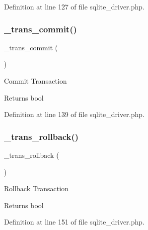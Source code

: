 Definition at line 127 of file sqlite\+\_\+driver.\+php.

\mbox{\label{class_c_i___d_b__sqlite__driver_a6fe7f373e0b11cfae23a5f41c0b35dda}} 
\subsubsection{\texorpdfstring{\_trans\_commit()}{\_trans\_commit()}}
{\footnotesize\ttfamily \+\_\+trans\+\_\+commit (\begin{DoxyParamCaption}{ }\end{DoxyParamCaption})\hspace{0.3cm}{\ttfamily [protected]}}

Commit Transaction

\begin{DoxyReturn}{Returns}
bool 
\end{DoxyReturn}


Definition at line 139 of file sqlite\+\_\+driver.\+php.

\mbox{\label{class_c_i___d_b__sqlite__driver_ad49a116b0776c26b53114c9093fd102a}} 
\subsubsection{\texorpdfstring{\_trans\_rollback()}{\_trans\_rollback()}}
{\footnotesize\ttfamily \+\_\+trans\+\_\+rollback (\begin{DoxyParamCaption}{ }\end{DoxyParamCaption})\hspace{0.3cm}{\ttfamily [protected]}}

Rollback Transaction

\begin{DoxyReturn}{Returns}
bool 
\end{DoxyReturn}


Definition at line 151 of file sqlite\+\_\+driver.\+php.

\mbox{\label{class_c_i___d_b__sqlite__driver_aa029600528fc1ce660a23ff4b4667f95}} 
